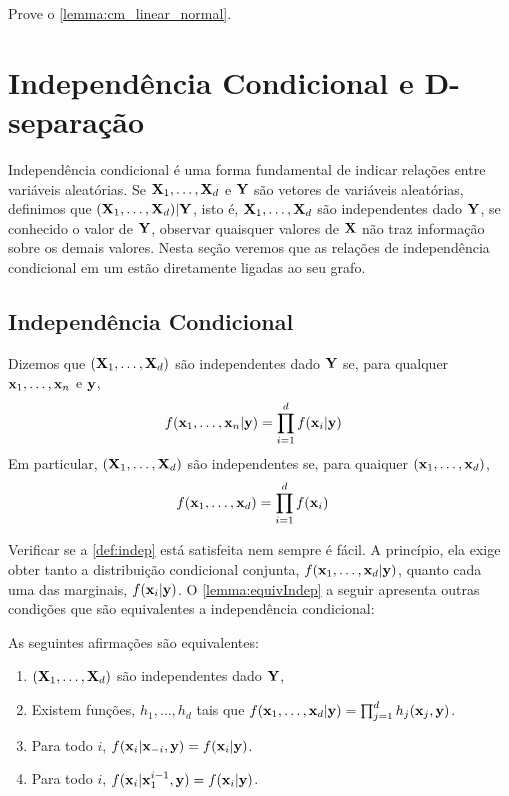 \begin{exercise}
 Prove o \cref{lemma:cm_linear_normal}.
\end{exercise}

\section{Independência Condicional e D-separação}
\label{sec:d-sep}

Independência condicional é uma forma fundamental de
indicar relações entre variáveis aleatórias.
Se ${\mathbf{X}}_1,\ldots,{\mathbf{X}}_d$ e ${\mathbf{Y}}$ são vetores de variáveis aleatórias,
definimos que $({\mathbf{X}}_1,\ldots,{\mathbf{X}}_d) | {\mathbf{Y}}$, isto é,
${\mathbf{X}}_1,\ldots,{\mathbf{X}}_d$ são independentes dado ${\mathbf{Y}}$, se
conhecido o valor de ${\mathbf{Y}}$, 
observar quaisquer valores de ${\mathbf{X}}$ não traz 
informação sobre os demais valores.
Nesta seção veremos que 
as relações de independência condicional em um \CM
estão diretamente ligadas ao seu grafo.

\subsection{Independência Condicional}
\label{sec:indep}

\begin{definition}
 \label{def:indep}
 Dizemos que $({\mathbf{X}}_1,\ldots,{\mathbf{X}}_d)$ são independentes dado ${\mathbf{Y}}$ se,
 para qualquer ${\mathbf{x}}_1,\ldots,{\mathbf{x}}_n$ e ${\mathbf{y}}$,
 \begin{align*}
  f({\mathbf{x}}_1,\ldots,{\mathbf{x}}_n|{\mathbf{y}})	&= \prod_{i=1}^d f({\mathbf{x}}_i|{\mathbf{y}})
 \end{align*}
 Em particular, $({\mathbf{X}}_1,\ldots,{\mathbf{X}}_d)$ são independentes se,
 para quaiquer $({\mathbf{x}}_1,\ldots,{\mathbf{x}}_d)$,
 \begin{align*}
  f({\mathbf{x}}_1,\ldots,{\mathbf{x}}_d)	&= \prod_{i=1}^d f({\mathbf{x}}_i)
 \end{align*}
\end{definition}

Verificar se a \cref{def:indep} está satisfeita nem sempre é fácil.
A princípio, ela exige obter tanto a distribuição condicional conjunta, 
$f({\mathbf{x}}_1,\ldots,{\mathbf{x}}_d|{\mathbf{y}})$, quanto cada uma das marginais, $f({\mathbf{x}}_i|{\mathbf{y}})$.
O \cref{lemma:equivIndep} a seguir apresenta outras condições que
são equivalentes a independência condicional:

\begin{lemma}
 \label{lemma:equivIndep}
 As seguintes afirmações são equivalentes:
 \begin{enumerate}
  \item $({\mathbf{X}}_1,\ldots,{\mathbf{X}}_d)$ são independentes dado ${\mathbf{Y}}$,
  \item Existem funções, $h_1,\ldots,h_d$ tais que
  $f({\mathbf{x}}_1,\ldots,{\mathbf{x}}_d|{\mathbf{y}}) = \prod_{j=1}^{d}{h_j({\mathbf{x}}_j,{\mathbf{y}})}$.	
	\item Para todo $i$, 
	$f({\mathbf{x}}_i|{\mathbf{x}}_{-i},{\mathbf{y}}) = f({\mathbf{x}}_i|{\mathbf{y}})$.
	\item Para todo $i$,
	$f({\mathbf{x}}_i|{\mathbf{x}}_1^{i-1},{\mathbf{y}}) = f({\mathbf{x}}_i|{\mathbf{y}})$.
 \end{enumerate}
\end{lemma}


